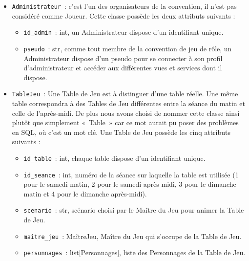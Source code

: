 \documentclass[11pt]{article}
\begin{document}
\begin{itemize}
    \item \texttt{Administrateur}~: c'est l'un des organisateurs de la convention, il n’est pas considéré comme Joueur. Cette classe possède les deux attributs suivants :
    \begin{itemize}[label=, font=\small]
        \item \texttt{id\_admin}~: int, un Administrateur dispose d'un identifiant unique.
        \item \texttt{pseudo}~: str, comme tout membre de la convention de jeu de rôle, un Administrateur dispose d'un pseudo pour se connecter à son profil d'administrateur et accéder aux différentes vues et services dont il dispose.
    \end{itemize}

    \item \texttt{TableJeu}~: Une Table de Jeu est à distinguer d'une table réelle. Une même table correspondra à des Tables de Jeu différentes entre la séance du matin et celle de l'après-midi. De plus nous avons choisi de nommer cette classe ainsi plutôt que simplement «~Table~» car ce mot aurait pu poser des problèmes en SQL, où c'est un mot clé. Une Table de Jeu possède les cinq attributs suivants :
    \begin{itemize}[label=, font=\small]
        \item \texttt{id\_table}~: int, chaque table dispose d'un  identifiant unique.
        \item \texttt{id\_seance}~: int, numéro de la séance sur laquelle la table est utilisée (1 pour le samedi matin, 2 pour le samedi après-midi, 3 pour le dimanche matin et 4 pour le dimanche après-midi).
        \item \texttt{scenario}~: str, scénario choisi par le Maître du Jeu pour animer la Table de Jeu.
        \item \texttt{maitre\_jeu}~: MaîtreJeu, Maître du Jeu qui s'occupe de la Table de Jeu.
        \item \texttt{personnages}~: list[Personnages], liste des Personnages de la Table de Jeu.
    \end{itemize}
    

\end{itemize}
\end{document}
